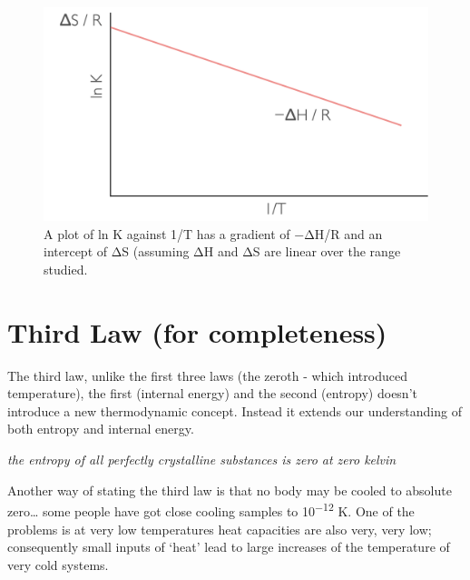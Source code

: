 \documentclass[
]{book}
\begin{document}
\begin{figure}

{\centering \includegraphics[width=1\linewidth]{images/vanthoff} 

}

\caption{A plot of ln K against 1/T  has a gradient of −ΔH/R and an intercept of ΔS (assuming ΔH and ΔS are linear over the range studied.}\label{fig:vanthoff}
\end{figure}

\hypertarget{third-law-for-completeness}{%
\section{Third Law (for completeness)}\label{third-law-for-completeness}}

The third law, unlike the first three laws (the zeroth - which introduced temperature), the first (internal energy) and the second (entropy) doesn't introduce a new thermodynamic concept. Instead it extends our understanding of both entropy and internal energy.

\emph{the entropy of all perfectly crystalline substances is zero at zero kelvin}

Another way of stating the third law is that no body may be cooled to absolute zero\ldots{} some people have got close cooling samples to 10\textsuperscript{−12} K. One of the problems is at very low temperatures heat capacities are also very, very low; consequently small inputs of `heat' lead to large increases of the temperature of very cold systems.
\end{document}
